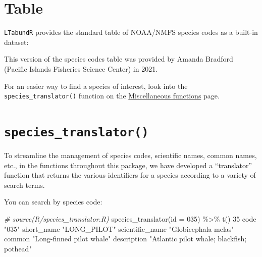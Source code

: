 \documentclass[
]{book}
\newenvironment{Shaded}{\begin{snugshade}}{\end{snugshade}}
\newcommand{\AttributeTok}[1]{\textcolor[rgb]{0.77,0.63,0.00}{#1}}
\newcommand{\CommentTok}[1]{\textcolor[rgb]{0.56,0.35,0.01}{\textit{#1}}}
\newcommand{\DecValTok}[1]{\textcolor[rgb]{0.00,0.00,0.81}{#1}}
\newcommand{\FunctionTok}[1]{\textcolor[rgb]{0.00,0.00,0.00}{#1}}
\newcommand{\NormalTok}[1]{#1}
\newcommand{\SpecialCharTok}[1]{\textcolor[rgb]{0.00,0.00,0.00}{#1}}
\newcommand{\StringTok}[1]{\textcolor[rgb]{0.31,0.60,0.02}{#1}}
\begin{document}
\hypertarget{table}{%
\section*{Table}\label{table}}

\texttt{LTabundR} provides the standard table of NOAA/NMFS species codes as a built-in dataset:

This version of the species codes table was provided by Amanda Bradford (Pacific Islands Fisheries Science Center) in 2021.

For an easier way to find a species of interest, look into the \texttt{species\_translator()} function on the \protect\hyperlink{misc_functions}{Miscellaneous functions} page.

\hypertarget{species_translator}{%
\section*{\texorpdfstring{\texttt{species\_translator()}}{species\_translator()}}\label{species_translator}}

To streamline the management of species codes, scientific names, common names, etc., in the functions throughout this package, we have developed a ``translator'' function that returns the various identifiers for a species according to a variety of search terms.

You can search by species code:

\begin{Shaded}
\begin{Highlighting}[]
\CommentTok{\# source(\textquotesingle{}R/species\_translator.R\textasciigrave{})}
\FunctionTok{species\_translator}\NormalTok{(}\AttributeTok{id =} \StringTok{\textquotesingle{}035\textquotesingle{}}\NormalTok{) }\SpecialCharTok{\%\textgreater{}\%} \FunctionTok{t}\NormalTok{()}
                \DecValTok{35}                                        
\NormalTok{code            }\StringTok{"035"}                                     
\NormalTok{short\_name      }\StringTok{"LONG\_PILOT"}                              
\NormalTok{scientific\_name }\StringTok{"Globicephala melas"}                      
\NormalTok{common          }\StringTok{"Long{-}finned pilot whale"}                 
\NormalTok{description     }\StringTok{"Atlantic pilot whale; blackfish; pothead"}
\end{Highlighting}
\end{Shaded}
\end{document}

